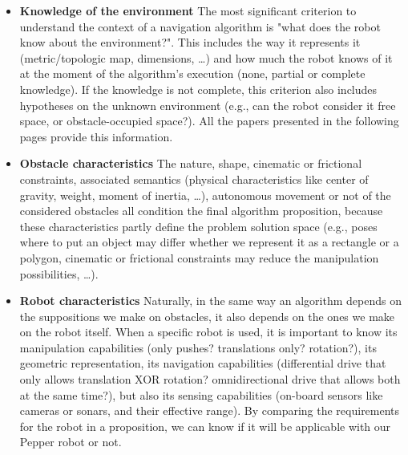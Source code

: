 \begin{itemize}
  \item \textbf{Knowledge of the environment} The most significant criterion to understand the context of a navigation algorithm is "what does the robot know about the environment?". This includes the way it represents it (metric/topologic map, dimensions, \dots) and how much the robot knows of it at the moment of the algorithm's execution (none, partial or complete knowledge). If the knowledge is not complete, this criterion also includes hypotheses on the unknown environment (e.g., can the robot consider it free space, or obstacle-occupied space?). All the papers presented in the following pages provide this information.
  \item \textbf{Obstacle characteristics} The nature, shape, cinematic or frictional constraints, associated semantics (physical characteristics like center of gravity, weight, moment of inertia, \dots), autonomous movement or not of the considered obstacles all condition the final algorithm proposition, because these characteristics partly define the problem solution space (e.g., poses where to put an object may differ whether we represent it as a rectangle or a polygon, cinematic or frictional constraints may reduce the manipulation possibilities, \dots).
  \item \textbf{Robot characteristics} Naturally, in the same way an algorithm depends on the suppositions we make on obstacles, it also depends on the ones we make on the robot itself. When a specific robot is used, it is important to know its manipulation capabilities (only pushes? translations only? rotation?), its geometric representation, its navigation capabilities (differential drive that only allows translation XOR rotation? omnidirectional drive that allows both at the same time?), but also its sensing capabilities (on-board sensors like cameras or sonars, and their effective range). By comparing the requirements for the robot in a proposition, we can know if it will be applicable with our Pepper robot or not.

\end{itemize}
